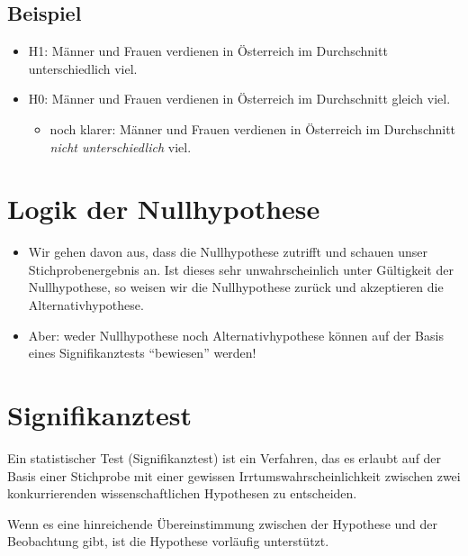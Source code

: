 \documentclass[
]{book}
\providecommand{\tightlist}{%
  \setlength{\itemsep}{0pt}\setlength{\parskip}{0pt}}
\begin{document}
\hypertarget{beispiel}{%
\subsection{Beispiel}\label{beispiel}}

\begin{itemize}
\tightlist
\item
  H1: Männer und Frauen verdienen in Österreich im Durchschnitt unterschiedlich viel.
\item
  H0: Männer und Frauen verdienen in Österreich im Durchschnitt gleich viel.

  \begin{itemize}
  \tightlist
  \item
    noch klarer: Männer und Frauen verdienen in Österreich im Durchschnitt \emph{nicht unterschiedlich} viel.
  \end{itemize}
\end{itemize}

\hypertarget{logik-der-nullhypothese}{%
\section{Logik der Nullhypothese}\label{logik-der-nullhypothese}}

\begin{itemize}
\tightlist
\item
  Wir gehen davon aus, dass die Nullhypothese zutrifft und schauen unser Stichprobenergebnis an. Ist dieses sehr unwahrscheinlich unter Gültigkeit der Nullhypothese, so weisen wir die Nullhypothese zurück und akzeptieren die Alternativhypothese.
\item
  Aber: weder Nullhypothese noch Alternativhypothese können auf der Basis eines Signifikanztests ``bewiesen'' werden!
\end{itemize}

\hypertarget{signifikanztest}{%
\section{Signifikanztest}\label{signifikanztest}}

Ein statistischer Test (Signifikanztest) ist ein Verfahren, das es erlaubt auf der Basis einer Stichprobe mit einer gewissen Irrtumswahrscheinlichkeit zwischen zwei konkurrierenden wissenschaftlichen Hypothesen zu entscheiden.

Wenn es eine hinreichende Übereinstimmung zwischen der Hypothese und der Beobachtung gibt, ist die Hypothese vorläufig unterstützt.
\end{document}

